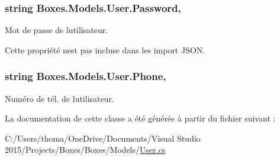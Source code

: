 \subsubsection[{\texorpdfstring{Password}{Password}}]{\setlength{\rightskip}{0pt plus 5cm}string Boxes.\+Models.\+User.\+Password\hspace{0.3cm}{\ttfamily [get]}, {\ttfamily [set]}}\hypertarget{class_boxes_1_1_models_1_1_user_a449e3d795a2be241d73b26ad4eb43a2d}{}\label{class_boxes_1_1_models_1_1_user_a449e3d795a2be241d73b26ad4eb43a2d}


Mot de passe de l\textquotesingle{}utilisateur. 

Cette propriété n\textquotesingle{}est pas incluse dans les import J\+S\+ON. 
\subsubsection[{\texorpdfstring{Phone}{Phone}}]{\setlength{\rightskip}{0pt plus 5cm}string Boxes.\+Models.\+User.\+Phone\hspace{0.3cm}{\ttfamily [get]}, {\ttfamily [set]}}\hypertarget{class_boxes_1_1_models_1_1_user_af7e275b122f36fbc4324d80bdd508ce7}{}\label{class_boxes_1_1_models_1_1_user_af7e275b122f36fbc4324d80bdd508ce7}


Numéro de tél. de l\textquotesingle{}utilisateur. 



La documentation de cette classe a été générée à partir du fichier suivant \+:\begin{DoxyCompactItemize}
\item 
C\+:/\+Users/thoma/\+One\+Drive/\+Documents/\+Visual Studio 2015/\+Projects/\+Boxes/\+Boxes/\+Models/\hyperlink{_user_8cs}{User.\+cs}\end{DoxyCompactItemize}
